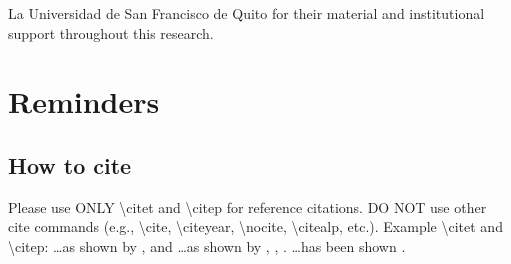\documentclass[draft,linenumbers]{agujournal2018}
\begin{document}
La Universidad de San Francisco de Quito for their material and
institutional support throughout this research.

\section{Reminders}

\subsection{How to cite}

Please use ONLY \textbackslash{}citet and \textbackslash{}citep for
reference citations. DO NOT use other cite commands (e.g.,
\textbackslash{}cite, \textbackslash{}citeyear, \textbackslash{}nocite,
\textbackslash{}citealp, etc.). Example \textbackslash{}citet and
\textbackslash{}citep: \ldots{}as shown by \citet{Levitus2012},
\citet{NunciO2011} and \citet{Raphael2004} \ldots{}as shown by
\citep{Levitus2012}, \citep{NunciO2011}, \citep{Raphael2004}.
\ldots{}has been shown
\citep[e.g.,][]{Levitus2012, NunciO2011, Raphael2004}.


\end{document}
